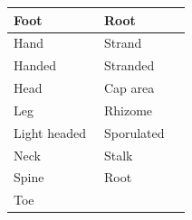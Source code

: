 \begin{longtable}{|>{\RaggedRight}p{0.48005\linewidth}|>{\RaggedRight}p{0.46281\linewidth}|}
\hspace*{0pt}\ignorespaces{}\hspace*{0pt}Foot&\hspace*{0pt}\ignorespaces{}\hspace*{0pt}Root\\ \hline \hspace*{0pt}\ignorespaces{}\hspace*{0pt}Hand&\hspace*{0pt}\ignorespaces{}\hspace*{0pt}Strand\\ \hline \hspace*{0pt}\ignorespaces{}\hspace*{0pt}Handed&\hspace*{0pt}\ignorespaces{}\hspace*{0pt}Stranded\\ \hline \hspace*{0pt}\ignorespaces{}\hspace*{0pt}Head&\hspace*{0pt}\ignorespaces{}\hspace*{0pt}Cap area\\ \hline \hspace*{0pt}\ignorespaces{}\hspace*{0pt}Leg&\hspace*{0pt}\ignorespaces{}\hspace*{0pt}Rhizome\\ \hline \hspace*{0pt}\ignorespaces{}\hspace*{0pt}Light headed&\hspace*{0pt}\ignorespaces{}\hspace*{0pt}Sporulated\\ \hline \hspace*{0pt}\ignorespaces{}\hspace*{0pt}Neck&\hspace*{0pt}\ignorespaces{}\hspace*{0pt}Stalk\\ \hline \hspace*{0pt}\ignorespaces{}\hspace*{0pt}Spine&\hspace*{0pt}\ignorespaces{}\hspace*{0pt}Root\\ \hline \hspace*{0pt}\ignorespaces{}\hspace*{0pt}Toe&\hspace*{0
\end{longtable}
